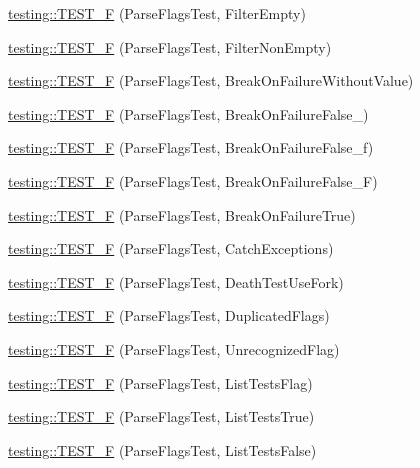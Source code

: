 \begin{DoxyCompactItemize}
\mbox{\hyperlink{namespacetesting_ac368692db2bffa72a1bf12f3469efec0}{testing\+::\+T\+E\+S\+T\+\_\+F}} (Parse\+Flags\+Test, Filter\+Empty)
\item 
\mbox{\hyperlink{namespacetesting_a31336a2ed0eea5de8066f5ae528a7ae0}{testing\+::\+T\+E\+S\+T\+\_\+F}} (Parse\+Flags\+Test, Filter\+Non\+Empty)
\item 
\mbox{\hyperlink{namespacetesting_ab540cabc9d829c20052609a685a01832}{testing\+::\+T\+E\+S\+T\+\_\+F}} (Parse\+Flags\+Test, Break\+On\+Failure\+Without\+Value)
\item 
\mbox{\hyperlink{namespacetesting_ac5a39f27868bd123d9c5bca03730845e}{testing\+::\+T\+E\+S\+T\+\_\+F}} (Parse\+Flags\+Test, Break\+On\+Failure\+False\+\_)
\item 
\mbox{\hyperlink{namespacetesting_afe2c0e1666f3dad816ae5dbdfc37357a}{testing\+::\+T\+E\+S\+T\+\_\+F}} (Parse\+Flags\+Test, Break\+On\+Failure\+False\+\_\+f)
\item 
\mbox{\hyperlink{namespacetesting_a92c1ef6a2453eaec5c33bb92dfd3667f}{testing\+::\+T\+E\+S\+T\+\_\+F}} (Parse\+Flags\+Test, Break\+On\+Failure\+False\+\_\+F)
\item 
\mbox{\hyperlink{namespacetesting_a2a23ab14983f9e6296149ac711301968}{testing\+::\+T\+E\+S\+T\+\_\+F}} (Parse\+Flags\+Test, Break\+On\+Failure\+True)
\item 
\mbox{\hyperlink{namespacetesting_a9e50d6fa46cc314e8d7fa4a829ee6c0d}{testing\+::\+T\+E\+S\+T\+\_\+F}} (Parse\+Flags\+Test, Catch\+Exceptions)
\item 
\mbox{\hyperlink{namespacetesting_a767f2b2467c0242492922c205a666e64}{testing\+::\+T\+E\+S\+T\+\_\+F}} (Parse\+Flags\+Test, Death\+Test\+Use\+Fork)
\item 
\mbox{\hyperlink{namespacetesting_a76c39020708d7e6646c8aeef149ea827}{testing\+::\+T\+E\+S\+T\+\_\+F}} (Parse\+Flags\+Test, Duplicated\+Flags)
\item 
\mbox{\hyperlink{namespacetesting_a876c9749edf7e23132e0b47ad8cfe02c}{testing\+::\+T\+E\+S\+T\+\_\+F}} (Parse\+Flags\+Test, Unrecognized\+Flag)
\item 
\mbox{\hyperlink{namespacetesting_a3fb86cb10e61ed9007bd22c5ba3b2c62}{testing\+::\+T\+E\+S\+T\+\_\+F}} (Parse\+Flags\+Test, List\+Tests\+Flag)
\item 
\mbox{\hyperlink{namespacetesting_a5ce87a07245c10d86d465cb8db493065}{testing\+::\+T\+E\+S\+T\+\_\+F}} (Parse\+Flags\+Test, List\+Tests\+True)
\item 
\mbox{\hyperlink{namespacetesting_a983e3df92745027bf68413ecc09f4198}{testing\+::\+T\+E\+S\+T\+\_\+F}} (Parse\+Flags\+Test, List\+Tests\+False)

\end{DoxyCompactItemize}
